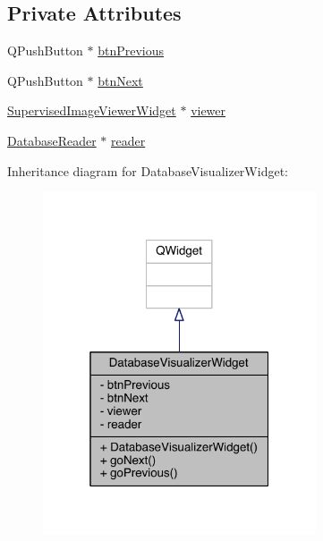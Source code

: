 \subsection*{Private Attributes}
\begin{DoxyCompactItemize}
\item 
Q\+Push\+Button $\ast$ \hyperlink{class_database_visualizer_widget_a01dafc7769283b01d50b4e539b3ea5a6}{btn\+Previous}
\item 
Q\+Push\+Button $\ast$ \hyperlink{class_database_visualizer_widget_ab1fc33de442247d3e112b84cde259b24}{btn\+Next}
\item 
\hyperlink{class_supervised_image_viewer_widget}{Supervised\+Image\+Viewer\+Widget} $\ast$ \hyperlink{class_database_visualizer_widget_a943fdaf6c76b8a3a36bd16e048f69711}{viewer}
\item 
\hyperlink{class_database_reader}{Database\+Reader} $\ast$ \hyperlink{class_database_visualizer_widget_a37786e95a3407c3df7b4f2e94324b9e7}{reader}
\end{DoxyCompactItemize}


Inheritance diagram for Database\+Visualizer\+Widget\+:\nopagebreak
\begin{figure}[H]
\begin{center}
\leavevmode
\includegraphics[width=229pt]{class_database_visualizer_widget__inherit__graph}
\end{center}
\end{figure}


